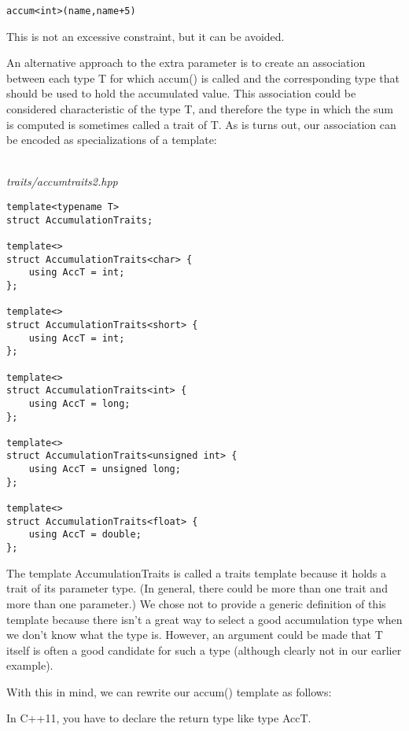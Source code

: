 \begin{lstlisting}[style=styleCXX]
accum<int>(name,name+5)
\end{lstlisting}

This is not an excessive constraint, but it can be avoided.

An alternative approach to the extra parameter is to create an association between each type T for which accum() is called and the corresponding type that should be used to hold the accumulated value. This association could be considered characteristic of the type T, and therefore the type in which the sum is computed is sometimes called a trait of T. As is turns out, our association can be encoded as specializations of a template:

\hspace*{\fill} \\ %
\noindent
\textit{traits/accumtraits2.hpp}
\begin{lstlisting}[style=styleCXX]
template<typename T>
struct AccumulationTraits;

template<>
struct AccumulationTraits<char> {
	using AccT = int;
};

template<>
struct AccumulationTraits<short> {
	using AccT = int;
};

template<>
struct AccumulationTraits<int> {
	using AccT = long;
};

template<>
struct AccumulationTraits<unsigned int> {
	using AccT = unsigned long;
};

template<>
struct AccumulationTraits<float> {
	using AccT = double;
};
\end{lstlisting}

The template AccumulationTraits is called a traits template because it holds a trait of its parameter type. (In general, there could be more than one trait and more than one parameter.) We chose not to provide a generic definition of this template because there isn’t a great way to select a good accumulation type when we don’t know what the type is. However, an argument could be made that T itself is often a good candidate for such a type (although clearly not in our earlier example).

With this in mind, we can rewrite our accum() template as follows:

\begin{tcolorbox}[colback=webgreen!5!white,colframe=webgreen!75!black]
\hspace*{0.75cm}In C++11, you have to declare the return type like type AccT.
\end{tcolorbox}

